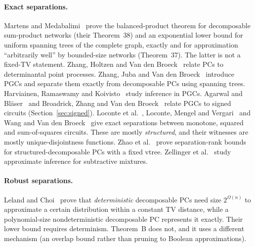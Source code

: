 \paragraph{Exact separations.} Martens and Medabalimi~\cite{MartensMedabalimi14} prove the balanced-product theorem for decomposable sum-product networks (their Theorem~38) and an exponential lower bound for uniform spanning trees of the complete graph, exactly and for approximation ``arbitrarily well'' by bounded-size networks (Theorem~37). The latter is not a fixed-TV statement. Zhang, Holtzen and Van den Broeck~\cite{ZhangHoltzenVdB20} relate PCs to determinantal point processes. Zhang, Juba and Van den Broeck~\cite{ZhangJubaVdB21} introduce PGCs and separate them exactly from decomposable PCs using spanning trees. Harviainen, Ramaswamy and Koivisto~\cite{HarviainenEtAl23} study inference in PGCs. Agarwal and Bl\"aser~\cite{AgarwalBlaser24} and Broadrick, Zhang and Van den Broeck~\cite{BroadrickZhangVdB24} relate PGCs to signed circuits (Section~\ref{sec:signed}). Loconte et al.~\cite{LoconteEtAl24}, Loconte, Mengel and Vergari~\cite{LoconteMengelVergari24} and Wang and Van den Broeck~\cite{WangVdB25} give exact separations between monotone, squared and sum-of-squares circuits. These are mostly \emph{structured}, and their witnesses are mostly unique-disjointness functions. Zhao et al.~\cite{ZhaoEtAl26} prove separation-rank bounds for structured-decomposable PCs with a fixed vtree. Zellinger et al.~\cite{ZellingerEtAl26} study approximate inference for subtractive mixtures.

\paragraph{Robust separations.} Leland and Choi~\cite{LelandChoi25} prove that \emph{deterministic} decomposable PCs need size $2^{\Omega(n)}$ to approximate a certain distribution within a constant TV distance, while a polynomial-size nondeterministic decomposable PC represents it exactly. Their lower bound requires determinism. Theorem~B does not, and it uses a different mechanism (an overlap bound rather than pruning to Boolean approximations).

